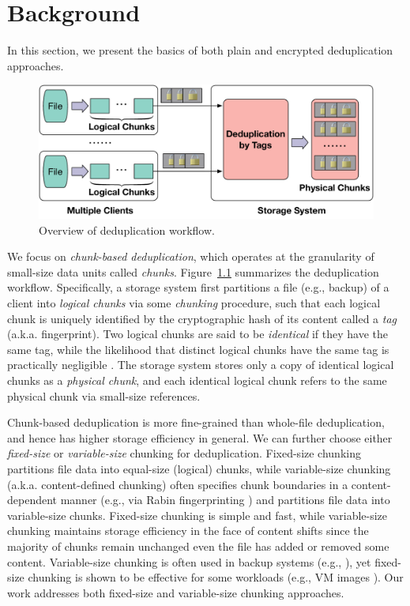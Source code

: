 \documentclass[bachelor]{thesis-uestc}
\begin{document}



\chapter{Background}
\label{sec:background}

In this section, we present the basics of both plain and encrypted
deduplication approaches. 

\begin{figure}[t]
\centering
\includegraphics[width=.48\textwidth]{pic/dedup-view.pdf}
\caption{Overview of  deduplication workflow.}
\label{fig:dedup-view}
\end{figure}

We focus on {\em chunk-based deduplication}, which operates at the granularity
of small-size data units called {\em chunks}.  Figure~\ref{fig:dedup-view}
summarizes the deduplication workflow.  Specifically, a storage system first
partitions a file (e.g., backup) of a client into {\em logical chunks} via
some {\em chunking} procedure, such that each logical chunk is uniquely
identified by the cryptographic hash of its content called a {\em tag} (a.k.a.
fingerprint).  Two logical chunks are said to be {\em identical} if they have
the same tag, while the likelihood that distinct logical chunks have the same
tag is practically negligible \cite{black06}.  The storage system stores only
a copy of identical logical chunks as a {\em physical chunk}, and each
identical logical chunk refers to the same physical chunk via small-size
references.  

Chunk-based deduplication is more fine-grained than whole-file deduplication,
and hence has higher storage efficiency in general.  We can further choose
either {\em fixed-size} or {\em variable-size} chunking for deduplication.
Fixed-size chunking partitions file data into equal-size (logical) chunks,
while variable-size chunking (a.k.a. content-defined chunking) often specifies
chunk boundaries in a content-dependent manner (e.g., via Rabin fingerprinting
\cite{rabin81}) and partitions file data into variable-size chunks.
Fixed-size chunking is simple and fast, while variable-size chunking maintains
storage efficiency in the face of content shifts since the majority of chunks
remain unchanged even the file has added or removed some content.
Variable-size chunking is often used in backup systems (e.g.,
\cite{zhu08,lillibridge09}), yet fixed-size chunking is shown to be effective
for some workloads (e.g., VM images \cite{jin09}).  Our work addresses both
fixed-size and variable-size chunking approaches.  
\end{document}
